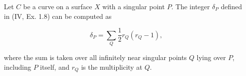 Let $C$ be a curve on a surface $X$ with a singular point $P$. The integer $\delta_P$ defined in (IV, Ex. 1.8) can be computed as

$$\delta_P = \sum_{Q} \frac{1}{2} r_Q(r_Q - 1),$$

where the sum is taken over all infinitely near singular points $Q$ lying over $P$, including $P$ itself, and $r_Q$ is the multiplicity at $Q$.
